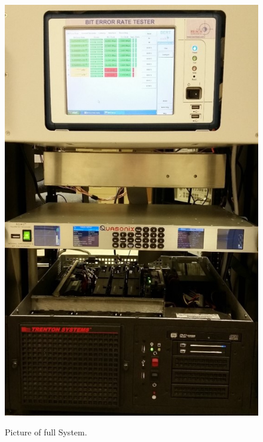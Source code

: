 \begin{figure}
	\centering\includegraphics[scale=1]{figures/systemOverview/FullSystem.jpg}
	\label{fig:FullSystem}
	\caption{Picture of full System.}
\end{figure}

